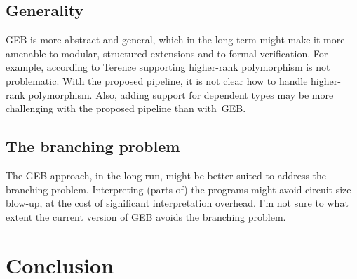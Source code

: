 \subsection{Generality}

GEB is more abstract and general, which in the long term might make it
more amenable to modular, structured extensions and to formal
verification. For example, according to Terence supporting higher-rank
polymorphism is not problematic. With the proposed pipeline, it is not
clear how to handle higher-rank polymorphism. Also, adding support for
dependent types may be more challenging with the proposed pipeline
than with~GEB.

\subsection{The branching problem}

The GEB approach, in the long run, might be better suited to address
the branching problem. Interpreting (parts of) the programs might
avoid circuit size blow-up, at the cost of significant interpretation
overhead. I'm not sure to what extent the current version of GEB
avoids the branching problem.

\section{Conclusion}\label{sec_conclusion}

